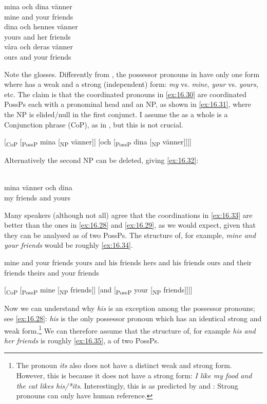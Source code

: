 \documentclass[output=paper]{langsci/langscibook}
\begin{document}
\ea\label{ex:16.30}
	\ea
		\gll mina och dina vänner\\
			mine   and  your friends\\
	\ex
		\gll dina och hennes vänner\\
			yours and her friends\\
	\ex
		\gll våra och deras vänner\\
			ours and your friends\\
	\z
\z

Note the glosses. Differently from , the possessor pronouns in 
have only one form where  has a weak and a strong (independent) form:
\emph{my} vs. \emph{mine}, \emph{your} vs. \emph{yours}, etc. The claim is that
the  coordinated pronouns in \eqref{ex:16.30} are coordinated PossPs
each with a pronominal head and an NP, as shown in \eqref{ex:16.31}, where
the NP is elided/null in the first conjunct. I assume the  as a
whole is a Conjunction phrase (CoP), as in \citet{Johannessen1998}, but this is
not crucial.

\ea\label{ex:16.31}
    {}[\textsubscript{CoP} [\textsubscript{PossP} mina [\textsubscript{NP} vänner]] [och [\textsubscript{PossP} dina [\textsubscript{NP} vänner]]]]
\z

Alternatively the second NP can be deleted, giving \eqref{ex:16.32}:

\ea\label{ex:16.32}\\
	\gll mina vänner och dina\\
		my friends    and yours\\
\z

Many speakers (although not all) agree that the  coordinations in \eqref{ex:16.33}
are better than the ones in \eqref{ex:16.28} and \eqref{ex:16.29}, as we would expect, given that they
can be analysed as  of two PossPs. The structure of, for example,
\emph{mine and your friends} would be roughly \eqref{ex:16.34}.

\ea\label{ex:16.33}
	\ea mine and your friends
	\ex yours and his friends
	\ex hers and his friends
	\ex ours and their friends
	\ex theirs and your friends
	\z
\z

\ea\label{ex:16.34}
    {}[\textsubscript{CoP} [\textsubscript{PossP} mine [\textsubscript{NP} friends]] [and [\textsubscript{PossP} your [\textsubscript{NP} friends]]]]
\z

Now we can understand why \emph{his} is an exception among the possessor
pronouns; see \eqref{ex:16.28}: \emph{his} is the only possessor pronoun which has an
identical strong and weak form.\footnote{ The pronoun \emph{its} also does not
have a distinct weak and strong form. However, this is because it does not have
a strong form: \emph{I like my food and the cat likes his/*its}. Interestingly,
this is as predicted by \citet{Cardinaletti1998} and \citet{CarSta1999}: Strong
pronouns can only have human reference.} We can therefore assume that the
structure of, for example \emph{his and her friends} is roughly
\eqref{ex:16.35}, a  of two PossPs.
\end{document}
